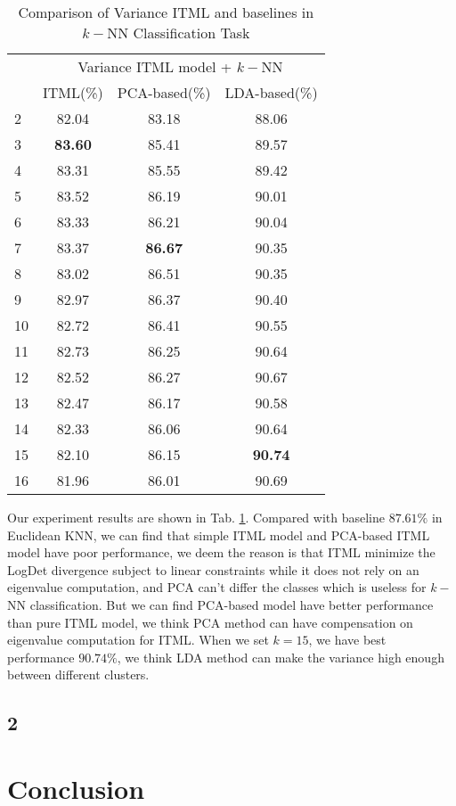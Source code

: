 \documentclass[conference]{IEEEtran}
\begin{document}
\begin{table}[htbp]
	\centering
 	\newcommand{\tabincell}[2]{\begin{tabular}{@{}#1@{}}#2\end{tabular}}
 	\renewcommand\arraystretch{1.0}
 	\caption{Comparison of Variance ITML and baselines in $k-$NN Classification Task}
 	\label{base2}%
 		\begin{tabular}{@{}p{2.5cm}<{\centering}|c|c|c}
 		\hline
 		\multirow{2}{*}{\diagbox[height=2\line,width=2.9cm,font=\tiny]{$\theta$}{Acc.}{$\mathit{M}$}} &
 		\multicolumn{3}{c}{Variance ITML model + $k-$NN}\\
 		\cline{2-4}
 		& {ITML(\%)} & {PCA-based(\%)} & {LDA-based(\%)}\\
 		\hline
 		2   & 82.04 & 83.18 & 88.06\\
 		\hline
 		3   & \textbf{83.60} & 85.41 & 89.57\\
 		\hline
 		4   & 83.31 & 85.55 & 89.42\\
 		\hline
 		5   & 83.52  & 86.19 & 90.01\\
 		\hline
 		6   & 83.33  & 86.21 & 90.04\\
 		\hline
 		7   & 83.37  & \textbf{86.67} & 90.35\\
 		\hline
 		8   & 83.02  & 86.51 & 90.35\\
 		\hline
 		9   & 82.97  & 86.37 & 90.40\\
 		\hline
 		10   & 82.72  & 86.41 & 90.55\\
 		\hline
 		11   & 82.73  & 86.25 & 90.64\\
 		\hline
 		12   & 82.52  & 86.27 & 90.67\\
 		\hline
 		13   & 82.47  & 86.17 & 90.58\\
 		\hline
 		14   & 82.33  & 86.06 & 90.64\\
 		\hline
 		15   & 82.10  & 86.15 & \textbf{90.74}\\
 		\hline
 		16   & 81.96  & 86.01 & 90.69\\
 		\hline
 	\end{tabular}
\end{table}

Our experiment results are shown in Tab. \ref{base2}. Compared with baseline $87.61\%$ in Euclidean KNN, we can find that simple ITML model and PCA-based ITML model have poor performance, we deem the reason is that ITML minimize the LogDet divergence subject to linear constraints while it does not rely on an eigenvalue computation, and PCA can't differ the classes which is useless for $k-$NN classification. But we can find PCA-based model have better performance than pure ITML model, we think PCA method can have compensation on eigenvalue computation for ITML. When we set $k=15$, we have best performance $90.74\%$, we think LDA method can make the variance high enough between different clusters. 


\subsection{2}

\section{Conclusion}


\end{document}
